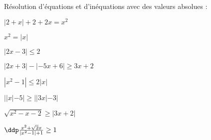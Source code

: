 
\begin{exercice} 
R\'esolution d'\'equations et d'in\'equations avec des valeurs absolues :
\begin{enumerate}
\noindent \begin{minipage}[t]{0.45\textwidth}
\item $|2+x|+2+2x=x^2$
\item $x^2=|x|$
\item $|2x-3|\leq 2$
\item $|2x+3|-|-5x+6|\geq 3x+2$
\end{minipage}
\begin{minipage}[t]{0.45\textwidth}
\item $|x^2-1|\leq 2|x|$
\item $||x| -5|\geq ||3x|-3|$
\item $\sqrt{x^2-x-2}\geq |3x+2|$
\item $\ddp\frac{ x^2+\sqrt{2}x }{|x^2-1|+1}\geq 1$
\end{minipage}
\end{enumerate}
\end{exercice}